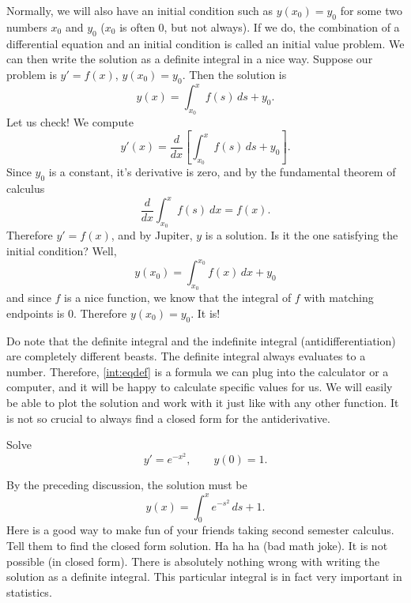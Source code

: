 \documentclass{ximera}
\begin{document}
Normally, we will also have an initial condition such as $y(x_0) = y_0$ for some two numbers $x_0$ and $y_0$ ($x_0$ is often 0, but not always). If we do, the combination of a differential equation and an initial condition is called an initial value problem. We can then write the solution as a definite integral in a nice way. Suppose our problem is $y' = f(x)$, $y(x_0) = y_0$.  Then the solution is
\begin{equation} \label{int:eqdef}
    y(x) = \int_{x_0}^x f(s) \,ds + y_0 .
\end{equation}
Let us check! We compute
\[
    y'(x) = \frac{d}{dx} \left[ \int_{x_0}^x f(s) \,ds + y_0 \right]. 
\] 
Since $y_0$ is a constant, it's derivative is zero, and by the fundamental theorem of calculus 
\[ 
    \frac{d}{dx} \int_{x_0}^x f(s)\ dx = f(x). 
\] 
Therefore $y' = f(x)$, and by Jupiter, $y$ is a solution.  Is it the one satisfying the initial condition?  Well, 
\[
    y(x_0) = \int_{x_0}^{x_0} f(x)\,dx + y_0
\] 
and since $f$ is a nice function, we know that the integral of $f$ with matching endpoints is $0$. Therefore $y(x_0) = y_0$.  It is!

Do note that the definite integral and the indefinite integral (antidifferentiation) are completely different beasts.  The definite integral always evaluates to a number.  Therefore, \eqref{int:eqdef} is a formula we can plug into the calculator or a computer, and it will be happy to calculate specific values for us.  We will easily be able to plot the solution and work with it just like with any other function. It is not so crucial to always find a closed form for the antiderivative.

\begin{example}
    Solve
    \begin{equation*}
        y' = e^{-x^2}, \qquad y(0) = 1 .
    \end{equation*}
\end{example}

\begin{exampleSol}
    By the preceding discussion, the solution must be
    \begin{equation*}
        y(x) = \int_0^x e^{-s^2} \,ds + 1 .
    \end{equation*}
    Here is a good way to make fun of your friends taking second semester calculus.  Tell them to find the closed form solution.  Ha ha ha (bad math joke).  It is not possible (in closed form). There is absolutely nothing wrong with writing the solution as a definite integral. This particular integral is in fact very important in statistics.
\end{exampleSol}
\end{document}
